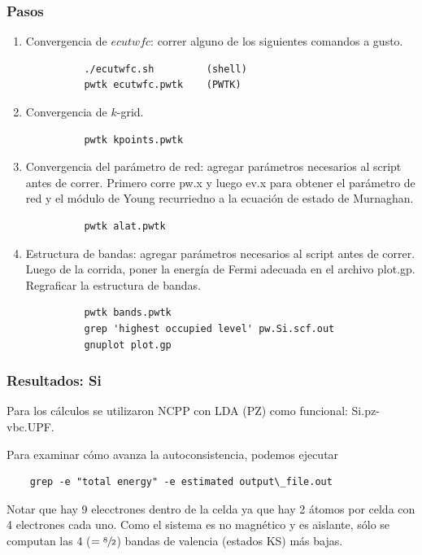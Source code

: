 \subsubsection{Pasos}

    \begin{enumerate}
      \item Convergencia de $ecutwfc$: correr alguno de los siguientes comandos a gusto.
        \begin{verbatim}
          ./ecutwfc.sh         (shell)
          pwtk ecutwfc.pwtk    (PWTK)
        \end{verbatim}
      \item Convergencia de $k$-grid.
        \begin{verbatim}
          pwtk kpoints.pwtk
        \end{verbatim}
      \item Convergencia del parámetro de red: agregar parámetros necesarios al script antes de correr. Primero corre pw.x y luego ev.x para obtener el parámetro de red y el módulo de Young recurriedno a la ecuación de estado de Murnaghan.
        \begin{verbatim}
          pwtk alat.pwtk
        \end{verbatim}
      \item Estructura de bandas: agregar parámetros necesarios al script antes de correr. Luego de la corrida, poner la energía de Fermi adecuada en el archivo plot.gp. Regraficar la estructura de bandas.
        \begin{verbatim}
          pwtk bands.pwtk
          grep 'highest occupied level' pw.Si.scf.out
          gnuplot plot.gp
        \end{verbatim}
    \end{enumerate}

\subsubsection{Resultados: Si}

  Para los cálculos se utilizaron NCPP con LDA (PZ) como funcional: Si.pz-vbc.UPF.

  Para examinar cómo avanza la autoconsistencia, podemos ejecutar
  \begin{verbatim}
    grep -e "total energy" -e estimated output\_file.out
  \end{verbatim}

  Notar que hay 9 elecctrones dentro de la celda ya que hay 2 átomos por celda con 4 electrones cada uno. Como el sistema es no magnético y es aislante, sólo se computan las 4 ($=\sfrac{8}{2}$) bandas de valencia (estados KS) más bajas.


